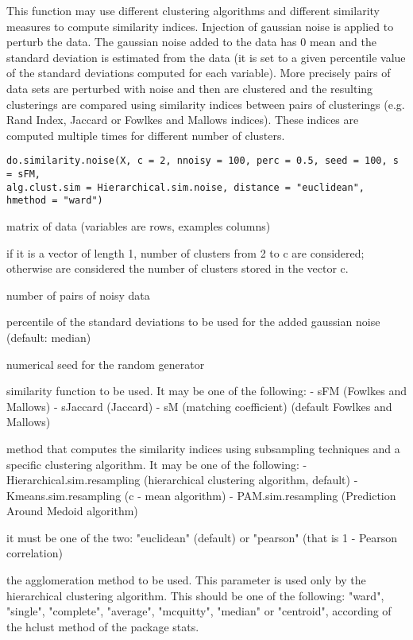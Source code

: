 \documentclass{article}
\begin{document}
\begin{Description}\relax
This function may use different clustering algorithms and different similarity measures to compute similarity indices.
Injection of gaussian noise  is applied to perturb the data. 
The gaussian noise  added to the data has 0 mean and the standard deviation is estimated from the data (it is 
set to a given percentile value of the standard deviations computed for each variable).
More precisely pairs of data sets are perturbed with noise 
and then are clustered and the resulting clusterings are compared using similarity indices between pairs of clusterings
(e.g. Rand Index, Jaccard or Fowlkes and Mallows indices). These indices are computed multiple times for different number of clusters.
\end{Description}
\begin{Usage}
\begin{verbatim}
do.similarity.noise(X, c = 2, nnoisy = 100, perc = 0.5, seed = 100, s = sFM, 
alg.clust.sim = Hierarchical.sim.noise, distance = "euclidean", hmethod = "ward")
\end{verbatim}
\end{Usage}
\begin{Arguments}
\begin{ldescription}
\item[\code{X}] matrix of data (variables are rows, examples columns)
\item[\code{c}] if it is a vector of length 1, number of clusters from 2 to c are considered; otherwise are considered 
the number of clusters stored in the vector c. 
\item[\code{nnoisy}] number of pairs of noisy data 
\item[\code{perc}] percentile of the standard deviations to be used for the added gaussian noise (default: median) 
\item[\code{seed}] numerical seed for the random generator 
\item[\code{s}] similarity function to be used. It may be one of the following: 
- sFM (Fowlkes and Mallows)
- sJaccard (Jaccard)
- sM (matching coefficient)
(default Fowlkes and Mallows)
\item[\code{alg.clust.sim}] method that computes the similarity indices using subsampling techniques and a specific clustering algorithm. 
It may be one of the following: 
- Hierarchical.sim.resampling (hierarchical clustering algorithm, default)
- Kmeans.sim.resampling (c - mean algorithm)
- PAM.sim.resampling (Prediction Around Medoid algorithm)
\item[\code{distance}] it must be one of the two: "euclidean" (default) or "pearson" (that is 1 - Pearson correlation) 
\item[\code{hmethod}] the agglomeration method to be used. This parameter is used only by the hierarchical clustering algorithm.
This should be one of the following:
"ward", "single", "complete", "average", "mcquitty", "median" or "centroid", according of the hclust
method of the package stats. 
\end{ldescription}
\end{Arguments}
\end{document}
